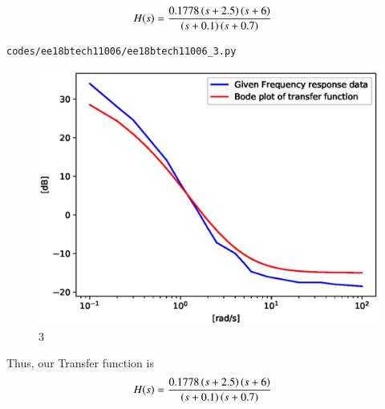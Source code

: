 \begin{enumerate}[label=\thesubsection.\arabic*.,ref=\thesubsection.\theenumi]
\begin{align}
H(s) &= \frac{0.1778\left(s+2.5\right)\left(s+6\right)}{\left(s+0.1\right)\left(s+0.7\right)} 
\end{align}
\begin{lstlisting}
codes/ee18btech11006/ee18btech11006_3.py
\end{lstlisting}
\begin{figure}[!ht]
\centering
\includegraphics[width=\columnwidth]{./figs/ee18btech11006/ee18btech11006_3.eps}
\caption{3}
\label{fig:ee18btech11006_3}
\end{figure}
Thus, our Transfer function is 
\begin{align}
H(s) &= \frac{0.1778\left(s+2.5\right)\left(s+6\right)}{\left(s+0.1\right)\left(s+0.7\right)}  
\end{align}
\end{enumerate}
